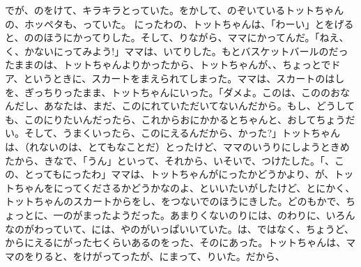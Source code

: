 でが、のをけて、キラキラとっていた。をかして、のぞいているトットちゃんの、ホッペタも、っていた。   にったわの、トットちゃんは、「わーい」とをげると、ののほうにかってりした。そして、りながら、ママにかってんだ。「ねえ、く、かないにってみよう!」ママは、いてりした。もとバスケットバールのだったままのは、トットちゃんよりかったから、トットちゃんが、、ちょっとでドア、というときに、スカートをまえられてしまった。ママは、スカートのはしを、ぎっちりったまま、トットちゃんにいった。「ダメよ。このは、こののおなんだし、あなたは、まだ、このにれていただいてないんだから。もし、どうしても、このにりたいんだったら、これからおにかかるとちゃんと、おしてちょうだい。そして、うまくいったら、このにえるんだから、かった?」トットちゃんは、（れないのは、とてもなことだ）とったけど、ママのいうりにしようときめたから、きなで、「うん」といって、それから、いそいで、つけたした。「、この、とってもにったわ」ママは、トットちゃんがにったかどうかより、が、トットちゃんをにってくださるかどうかなのよ、といいたいがしたけど、とにかく、トットちゃんのスカートからをし、をつないでのほうにきした。どのもかで、ちょっとに、一のがまったようだった。あまりくないのりには、のわりに、いろんなのがわっていて、には、やのがいっぱいいていた。は、ではなく、ちょうど、からにえるにがった七くらいあるのをった、そのにあった。トットちゃんは、ママのをりると、をけがってったが、にまって、りいた。だから、